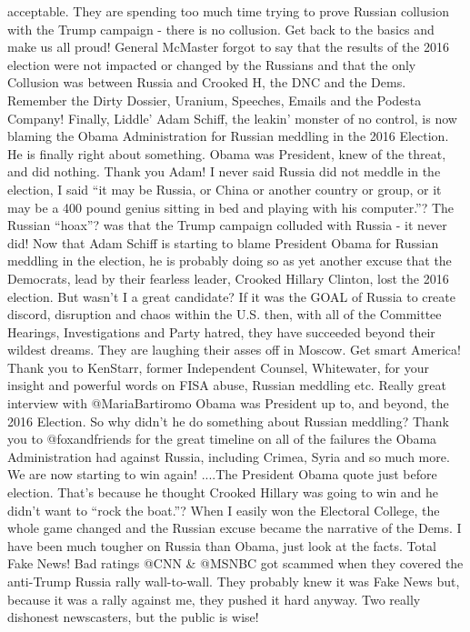 acceptable. They are spending too much time trying to prove Russian
collusion with the Trump campaign - there is no collusion. Get back to
the basics and make us all proud! General McMaster forgot to say that
the results of the 2016 election were not impacted or changed by the
Russians and that the only Collusion was between Russia and Crooked H,
the DNC and the Dems. Remember the Dirty Dossier, Uranium, Speeches,
Emails and the Podesta Company! Finally, Liddle' Adam Schiff, the
leakin' monster of no control, is now blaming the Obama Administration
for Russian meddling in the 2016 Election. He is finally right about
something. Obama was President, knew of the threat, and did nothing.
Thank you Adam! I never said Russia did not meddle in the election, I
said ``it may be Russia, or China or another country or group, or it may
be a 400 pound genius sitting in bed and playing with his computer.''?
The Russian ``hoax''? was that the Trump campaign colluded with Russia -
it never did! Now that Adam Schiff is starting to blame President Obama
for Russian meddling in the election, he is probably doing so as yet
another excuse that the Democrats, lead by their fearless leader,
Crooked Hillary Clinton, lost the 2016 election. But wasn't I a great
candidate? If it was the GOAL of Russia to create discord, disruption
and chaos within the U.S. then, with all of the Committee Hearings,
Investigations and Party hatred, they have succeeded beyond their
wildest dreams. They are laughing their asses off in Moscow. Get smart
America! Thank you to KenStarr, former Independent Counsel, Whitewater,
for your insight and powerful words on FISA abuse, Russian meddling etc.
Really great interview with @MariaBartiromo Obama was President up to,
and beyond, the 2016 Election. So why didn't he do something about
Russian meddling? Thank you to @foxandfriends for the great timeline on
all of the failures the Obama Administration had against Russia,
including Crimea, Syria and so much more. We are now starting to win
again! ....The President Obama quote just before election. That's
because he thought Crooked Hillary was going to win and he didn't want
to ``rock the boat.''? When I easily won the Electoral College, the
whole game changed and the Russian excuse became the narrative of the
Dems. I have been much tougher on Russia than Obama, just look at the
facts. Total Fake News! Bad ratings @CNN \& @MSNBC got scammed when they
covered the anti-Trump Russia rally wall-to-wall. They probably knew it
was Fake News but, because it was a rally against me, they pushed it
hard anyway. Two really dishonest newscasters, but the public is wise!
